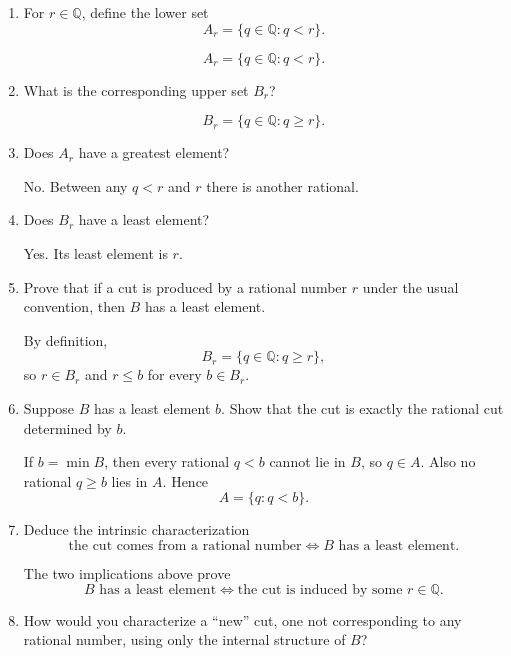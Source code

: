 \documentclass{self-check}
\begin{document}
\begin{enumerate}[label=\arabic{*}., itemsep=10pt]
  \item For \(r\in\mathbb{Q}\), define the lower set
    \[ A_{r}=\{q\in\mathbb{Q}:q<r\}. \]

    \begin{answer}
      \[ A_{r}=\{q\in\mathbb{Q}:q<r\}. \]
    \end{answer}
  \item What is the corresponding upper set \(B_{r}\)?

    \begin{answer}
      \[ B_{r}=\{q\in\mathbb{Q}:q\ge r\}. \]
    \end{answer}
  \item Does \(A_{r}\) have a greatest element?

    \begin{answer}
      No. Between any \(q<r\) and \(r\) there is another rational.
    \end{answer}
  \item Does \(B_{r}\) have a least element?

    \begin{answer}
      Yes. Its least element is \(r\).
    \end{answer}
  \item Prove that if a cut is produced by a rational number \(r\) under the usual convention, then \(B\) has a least element.

    \begin{answer}
      By definition,
      \[ B_{r}=\{q\in\mathbb{Q}:q\ge r\}, \]
      so \(r\in B_{r}\) and \(r\le b\) for every \(b\in B_{r}\).
    \end{answer}
  \item Suppose \(B\) has a least element \(b\). Show that the cut is exactly the rational cut determined by \(b\).

    \begin{answer}
      If \(b=\min B\), then every rational \(q<b\) cannot lie in \(B\), so \(q\in A\). Also no rational \(q\ge b\) lies in \(A\). Hence
      \[ A=\{q:q<b\}. \]
    \end{answer}
  \item Deduce the intrinsic characterization
    \[ \text{the cut comes from a rational number}\iff B\text{ has a least element}. \]

    \begin{answer}
      The two implications above prove
      \[ B\text{ has a least element}\iff \text{the cut is induced by some }r\in\mathbb{Q}. \]
    \end{answer}
  \item How would you characterize a ``new'' cut, one not corresponding to any rational number, using only the internal structure of \(B\)?


\end{enumerate}
\end{document}
